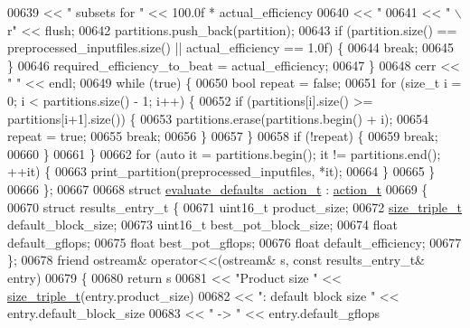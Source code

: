 \begin{DoxyCode}
{{{{00639            << \textcolor{stringliteral}{" subsets for "} << 100.0f * actual\_efficiency
00640            << \textcolor{stringliteral}{" %
00641            << \textcolor{stringliteral}{"                  \(\backslash\)r"} << flush;
00642       partitions.push\_back(partition);
00643       \textcolor{keywordflow}{if} (partition.size() == preprocessed\_inputfiles.size() || actual\_efficiency == 1.0f) \{
00644         \textcolor{keywordflow}{break};
00645       \}
00646       required\_efficiency\_to\_beat = actual\_efficiency;
00647     \}
00648     cerr << \textcolor{stringliteral}{"                                                                  "} << endl;
00649     \textcolor{keywordflow}{while} (\textcolor{keyword}{true}) \{
00650       \textcolor{keywordtype}{bool} repeat = \textcolor{keyword}{false};
00651       \textcolor{keywordflow}{for} (\textcolor{keywordtype}{size\_t} i = 0; i < partitions.size() - 1; i++) \{
00652         \textcolor{keywordflow}{if} (partitions[i].size() >= partitions[i+1].size()) \{
00653           partitions.erase(partitions.begin() + i);
00654           repeat = \textcolor{keyword}{true};
00655           \textcolor{keywordflow}{break};
00656         \}
00657       \}
00658       \textcolor{keywordflow}{if} (!repeat) \{
00659         \textcolor{keywordflow}{break};
00660       \}
00661     \}
00662     \textcolor{keywordflow}{for} (\textcolor{keyword}{auto} it = partitions.begin(); it != partitions.end(); ++it) \{
00663       print\_partition(preprocessed\_inputfiles, *it);
00664     \}
00665   \}
00666 \};
00667 
00668 \textcolor{keyword}{struct }\hyperlink{structevaluate__defaults__action__t}{evaluate\_defaults\_action\_t} : \hyperlink{structaction__t}{action\_t}
00669 \{
00670   \textcolor{keyword}{struct }results\_entry\_t \{
00671     uint16\_t product\_size;
00672     \hyperlink{structsize__triple__t}{size\_triple\_t} default\_block\_size;
00673     uint16\_t best\_pot\_block\_size;
00674     \textcolor{keywordtype}{float} default\_gflops;
00675     \textcolor{keywordtype}{float} best\_pot\_gflops;
00676     \textcolor{keywordtype}{float} default\_efficiency;
00677   \};
00678   \textcolor{keyword}{friend} ostream& operator<<(ostream& s, \textcolor{keyword}{const} results\_entry\_t& entry)
00679   \{
00680     \textcolor{keywordflow}{return} s
00681       << \textcolor{stringliteral}{"Product size "} << \hyperlink{structsize__triple__t}{size\_triple\_t}(entry.product\_size)
00682       << \textcolor{stringliteral}{": default block size "} << entry.default\_block\_size
00683       << \textcolor{stringliteral}{" -> "} << entry.default\_gflops
}}}}}
\end{DoxyCode}
